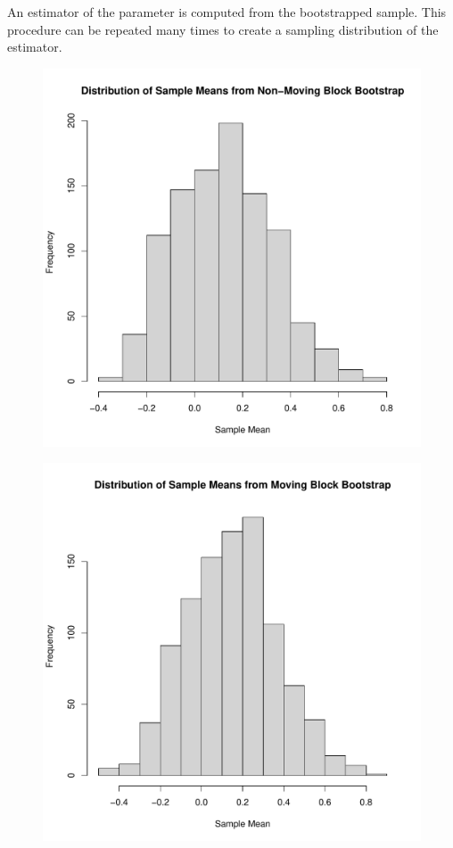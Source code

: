 \documentclass[12pt, letterpaper, titlepage]{article}
\begin{document}
An estimator of the parameter is computed from the bootstrapped sample. This procedure can be repeated many times to create a sampling distribution of the estimator. 

\begin{figure}[h]
  \centering
  \includegraphics[width=\textwidth]{nm_dist}
  \caption{}
  \label{fig:nm_dist}
\end{figure}

\begin{figure}[h]
  \centering
  \includegraphics[width=\textwidth]{mv_dist}
  \caption{}
  \label{fig:mv_dist}
\end{figure}
\end{document}
